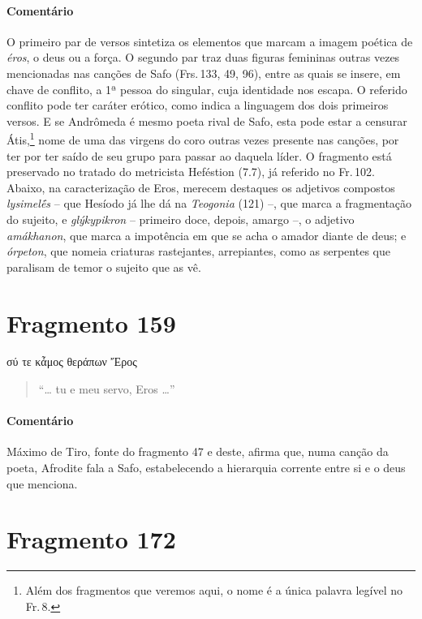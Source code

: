 \pagebreak
{\paragraph{Comentário} O primeiro par de versos sintetiza os elementos que marcam a imagem poética de
\textit{éros}, o deus ou a força. O segundo par traz duas figuras femininas
outras vezes mencionadas nas canções de Safo (Frs.\,133, 49, 96), entre
as quais se insere, em chave de conflito, a 1ª pessoa do singular, cuja
identidade nos escapa. O referido conflito pode ter caráter
erótico, como indica a linguagem dos dois primeiros versos. E se Andrômeda é mesmo poeta rival de Safo, esta pode estar a censurar Átis,\footnote{Além dos fragmentos que veremos aqui, o nome é a única palavra legível no Fr.\,8.} nome de uma das virgens do coro outras vezes presente nas canções, por ter
por ter saído de seu grupo para passar ao daquela líder. O fragmento está preservado no tratado do metricista Heféstion (7.7), já
referido no Fr.\,102.
Abaixo, na caracterização de Eros, merecem destaques os adjetivos  compostos \textit{lysimelḗs } -- que Hesíodo já lhe dá na \textit{Teogonia} (121) --, que marca a fragmentação do sujeito, e \textit{glýkypikron} -- primeiro doce, depois, amargo --, o adjetivo \textit{amákhanon}, que marca a impotência em que se acha o amador diante de deus; e \textit{órpeton}, que nomeia criaturas rastejantes, arrepiantes, como as serpentes que paralisam de temor o sujeito que as vê.}


\pagebreak
\section{Fragmento 159}

\begin{gkverse}
σύ τε κἆμος θεράπων Ἔρος
\end{gkverse}

\begin{verse}
“\ldots{} tu e meu servo, Eros \ldots{}”
\end{verse}

{\paragraph{Comentário} Máximo de Tiro, fonte do fragmento 47 e deste, afirma que, numa canção da poeta,
Afrodite fala a Safo, estabelecendo a hierarquia corrente entre si e o deus que
menciona.}

\section{Fragmento 172}

